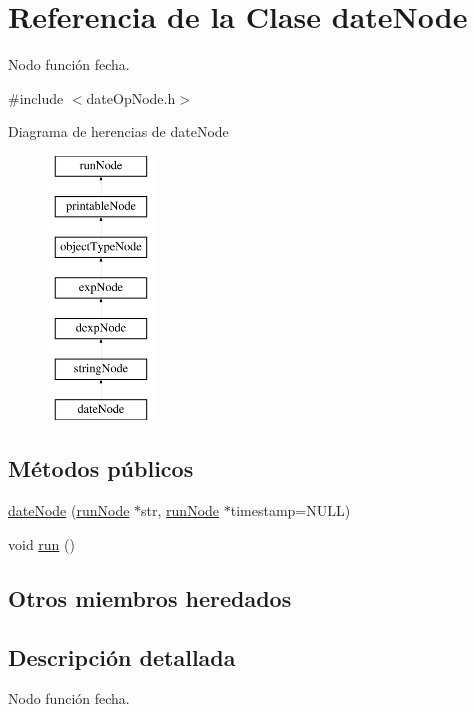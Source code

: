 \hypertarget{classdateNode}{\section{Referencia de la Clase date\-Node}
\label{classdateNode}
}


Nodo función fecha.  




{\ttfamily \#include $<$date\-Op\-Node.\-h$>$}

Diagrama de herencias de date\-Node\begin{figure}[H]
\begin{center}
\leavevmode
\includegraphics[height=7.000000cm]{classdateNode}
\end{center}
\end{figure}
\subsection*{Métodos públicos}
\begin{DoxyCompactItemize}
\item 
\hyperlink{classdateNode_a3227bbfae0a0bdf38bc312a525b4216c}{date\-Node} (\hyperlink{classrunNode}{run\-Node} $\ast$str, \hyperlink{classrunNode}{run\-Node} $\ast$timestamp=N\-U\-L\-L)
\item 
void \hyperlink{classdateNode_ad13a252816fd28e65c027ad49d8c3976}{run} ()
\end{DoxyCompactItemize}
\subsection*{Otros miembros heredados}


\subsection{Descripción detallada}
Nodo función fecha. 

